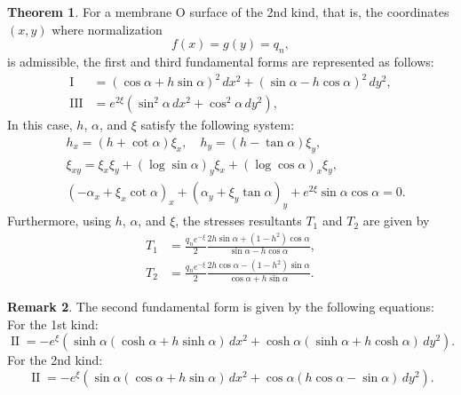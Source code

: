 \documentclass[a4paper]{amsart}
\newcommand{\first}{\operatorname{I}}
\newcommand{\second}{\operatorname{II}}
\newcommand{\third}{\operatorname{III}}
\theoremstyle{definition}
\newtheorem{thm}{Theorem}[section]
\newtheorem{rmk}[thm]{Remark}
\begin{document}
%
\begin{thm}
\label{thm:main1_2nd}
For a membrane O surface of the 2nd kind, that is, the coordinates $(x, y)$ where normalization
\begin{equation}
f(x) = g(y) = q_n,
\end{equation}
is admissible, the first and third fundamental forms are represented as follows:
\begin{equation}
\begin{aligned}
\first &= (\cos \alpha + h \sin \alpha)^2 \, dx^2 + (\sin \alpha - h \cos \alpha)^2 \, dy^2,\\
\third &= e^{2\xi} (\sin^2 \alpha \, dx^2 + \cos^2 \alpha \, dy^2),
\end{aligned}
\end{equation}
In this case, $h$, $\alpha$, and $\xi$ satisfy the following system:
\begin{equation}
\label{eq:2nd_govern}
\begin{aligned}
&h_x = (h + \cot \alpha) \xi_x, \quad
h_y = (h - \tan \alpha) \xi_y,\\
&\xi_{xy} = \xi_x \xi_y + (\log \sin \alpha)_y \xi_x + (\log \cos \alpha)_x \xi_y,\\
&(-\alpha_x + \xi_x \cot \alpha)_x + (\alpha_y + \xi_y \tan \alpha)_y + e^{2\xi} \sin \alpha \cos \alpha = 0.
\end{aligned}
\end{equation}
Furthermore, using $h$, $\alpha$, and $\xi$, the stresses resultants $T_1$ and $T_2$ are given by
\begin{equation}
\label{eq:2nd_stress}
\begin{aligned}
T_1 
&= \frac{q_ne^{-\xi}}{2} \frac{2h \sin \alpha + (1-h^2)\cos \alpha}{\sin \alpha - h \cos \alpha},\\
T_2
&= \frac{q_ne^{-\xi}}{2} \frac{2h \cos \alpha - (1-h^2)\sin \alpha}{\cos \alpha + h \sin \alpha}.
\end{aligned}
\end{equation}
\end{thm}
%
\begin{rmk}
The second fundamental form is given by the following equations: 
For the 1st kind:
\begin{equation}
\second = -e^\xi (\sinh \alpha (\cosh \alpha + h \sinh \alpha) \, dx^2 + \cosh \alpha (\sinh \alpha + h \cosh \alpha)\, dy^2).
\end{equation}
For the 2nd kind:
\begin{equation}
\second = -e^\xi (\sin \alpha (\cos \alpha + h \sin \alpha) \, dx^2 + \cos \alpha (h \cos \alpha- \sin \alpha)\, dy^2).
\end{equation}
\end{rmk}
\end{document}
